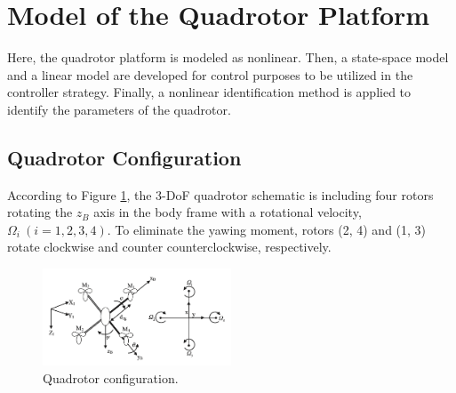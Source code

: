 \documentclass[peerreview]{IEEEtran}
\begin{document}

\section{Model of the Quadrotor Platform}\label{sec:modeling}
Here, the quadrotor platform is modeled as nonlinear.
Then, a state-space model and a linear model are developed for control purposes to be utilized in the controller strategy.
Finally, a nonlinear identification method is applied to identify the parameters of the quadrotor.
\subsection{Quadrotor Configuration}
According to Figure \ref{fig:schematic}, the 3-DoF quadrotor schematic is including four rotors rotating the $z_B$ axis in the body frame with a rotational velocity, $\Omega_i~(i=1, 2, 3, 4)$. To eliminate the yawing moment, rotors (2, 4) and (1, 3) rotate clockwise and counter counterclockwise, respectively.

\begin{figure}[H]
  \centering
  \includegraphics[width=0.5\textwidth]{../Figure/schematic.png}
  \caption{Quadrotor configuration.}
  \label{fig:schematic}
\end{figure}
\end{document}
